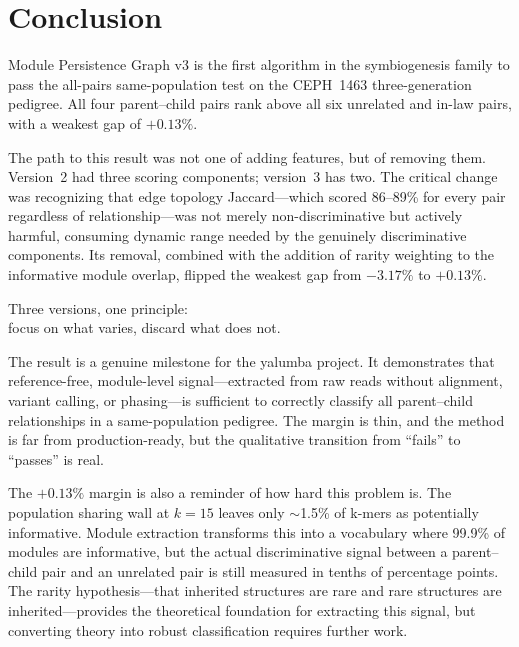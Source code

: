 \documentclass{../yalumba}
\begin{document}
\section{Conclusion}
\label{sec:conclusion}

Module Persistence Graph v3 is the first algorithm in the symbiogenesis
family to pass the all-pairs same-population test on the CEPH~1463
three-generation pedigree.  All four parent--child pairs rank above all six
unrelated and in-law pairs, with a weakest gap of $+0.13\%$.

The path to this result was not one of adding features, but of removing them.
Version~2 had three scoring components; version~3 has two.  The critical
change was recognizing that edge topology Jaccard---which scored 86--89\% for
every pair regardless of relationship---was not merely non-discriminative but
actively harmful, consuming dynamic range needed by the genuinely discriminative
components.  Its removal, combined with the addition of rarity weighting to
the informative module overlap, flipped the weakest gap from $-3.17\%$ to
$+0.13\%$.

\begin{pullquote}
Three versions, one principle:\\
focus on what varies, discard what does not.
\end{pullquote}

The result is a genuine milestone for the yalumba project.  It demonstrates
that reference-free, module-level signal---extracted from raw reads without
alignment, variant calling, or phasing---is sufficient to correctly classify
all parent--child relationships in a same-population pedigree.  The margin is
thin, and the method is far from production-ready, but the qualitative
transition from ``fails'' to ``passes'' is real.

The $+0.13\%$ margin is also a reminder of how hard this problem is.  The
population sharing wall at $k = 15$ leaves only $\sim$1.5\% of k-mers as
potentially informative.  Module extraction transforms this into a vocabulary
where 99.9\% of modules are informative, but the actual discriminative signal
between a parent--child pair and an unrelated pair is still measured in tenths
of percentage points.  The rarity hypothesis---that inherited structures are
rare and rare structures are inherited---provides the theoretical foundation
for extracting this signal, but converting theory into robust classification
requires further work.
\end{document}
